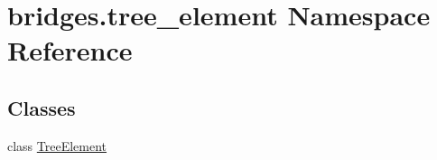\hypertarget{namespacebridges_1_1tree__element}{}\section{bridges.\+tree\+\_\+element Namespace Reference}
\label{namespacebridges_1_1tree__element}
\subsection*{Classes}
\begin{DoxyCompactItemize}
\item 
class \hyperlink{classbridges_1_1tree__element_1_1_tree_element}{Tree\+Element}
\end{DoxyCompactItemize}

